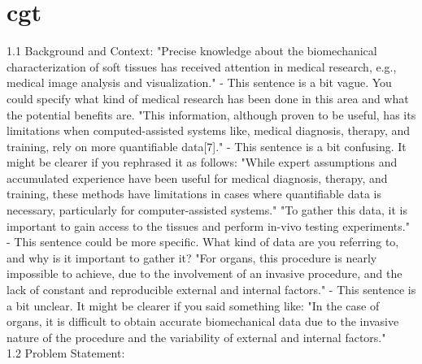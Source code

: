  \section{cgt}
1.1 Background and Context:
"Precise knowledge about the biomechanical characterization of soft tissues has received attention in medical research, e.g., medical image analysis and visualization." - This sentence is a bit vague. You could specify what kind of medical research has been done in this area and what the potential benefits are.
"This information, although proven to be useful, has its limitations when computed-assisted systems like, medical diagnosis, therapy, and training, rely on more quantifiable data[7]." - This sentence is a bit confusing. It might be clearer if you rephrased it as follows: "While expert assumptions and accumulated experience have been useful for medical diagnosis, therapy, and training, these methods have limitations in cases where quantifiable data is necessary, particularly for computer-assisted systems."
"To gather this data, it is important to gain access to the tissues and perform in-vivo testing experiments." - This sentence could be more specific. What kind of data are you referring to, and why is it important to gather it?
"For organs, this procedure is nearly impossible to achieve, due to the involvement of an invasive procedure, and the lack of constant and reproducible external and internal factors." - This sentence is a bit unclear. It might be clearer if you said something like: "In the case of organs, it is difficult to obtain accurate biomechanical data due to the invasive nature of the procedure and the variability of external and internal factors."\\
1.2 Problem Statement:

